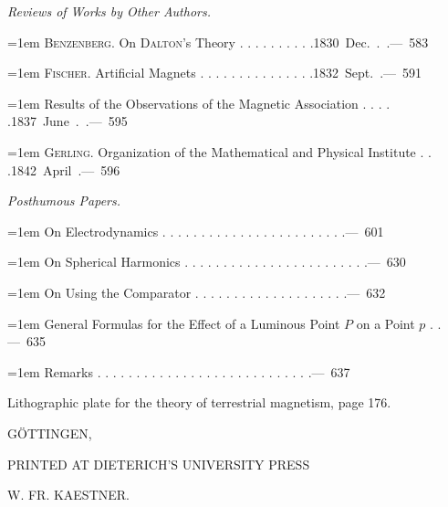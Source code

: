\par{}\medskip\noindent\textit{Reviews of Works by Other Authors.}\par\smallskip
\noindent\hangindent=1em \textsc{Benzenberg.} On \textsc{Dalton}'s Theory . . . . . . . . . .\unskip\hspace{1em plus 1fill}\mbox{1830 Dec. . .\quad — 583}\par\smallskip
\noindent\hangindent=1em \textsc{Fischer.} Artificial Magnets . . . . . . . . . . . . . . .\unskip\hspace{1em plus 1fill}\mbox{1832 Sept. .\quad — 591}\par\smallskip
\noindent\hangindent=1em Results of the Observations of the Magnetic Association . . . . .\unskip\hspace{1em plus 1fill}\mbox{1837 June . .\quad — 595}\par\smallskip
\noindent\hangindent=1em \textsc{Gerling.} Organization of the Mathematical and Physical Institute . . .\unskip\hspace{1em plus 1fill}\mbox{1842 April .\quad — 596}\par\smallskip
\par{}\medskip\noindent\textit{Posthumous Papers.}\par\smallskip
\noindent\hangindent=1em On Electrodynamics . . . . . . . . . . . . . . . . . . . . . . . .\unskip\hspace{1em plus 1fill}\mbox{\quad — 601}\par\smallskip
\noindent\hangindent=1em On Spherical Harmonics . . . . . . . . . . . . . . . . . . . . . . . .\unskip\hspace{1em plus 1fill}\mbox{\quad — 630}\par\smallskip
\noindent\hangindent=1em On Using the Comparator . . . . . . . . . . . . . . . . . . . .\unskip\hspace{1em plus 1fill}\mbox{\quad — 632}\par\smallskip
\noindent\hangindent=1em General Formulas for the Effect of a Luminous Point $P$ on a Point $p$ . .\unskip\hspace{1em plus 1fill}\mbox{\quad — 635}\par\smallskip
\noindent\hangindent=1em Remarks . . . . . . . . . . . . . . . . . . . . . . . . . . . .\unskip\hspace{1em plus 1fill}\mbox{\quad — 637}\par\smallskip
\par\medskip\noindent Lithographic plate for the theory of terrestrial magnetism, page 176.
\endgroup

\par\nopagebreak[4]\medskip\noindent\makebox[\linewidth][c]{\rule{.15\linewidth}{.35pt}}\par\nopagebreak[4]
\bigskip
\begin{center}
GÖTTINGEN,\par
\small PRINTED AT DIETERICH’S UNIVERSITY PRESS\par
W. FR. KAESTNER.
\end{center}
